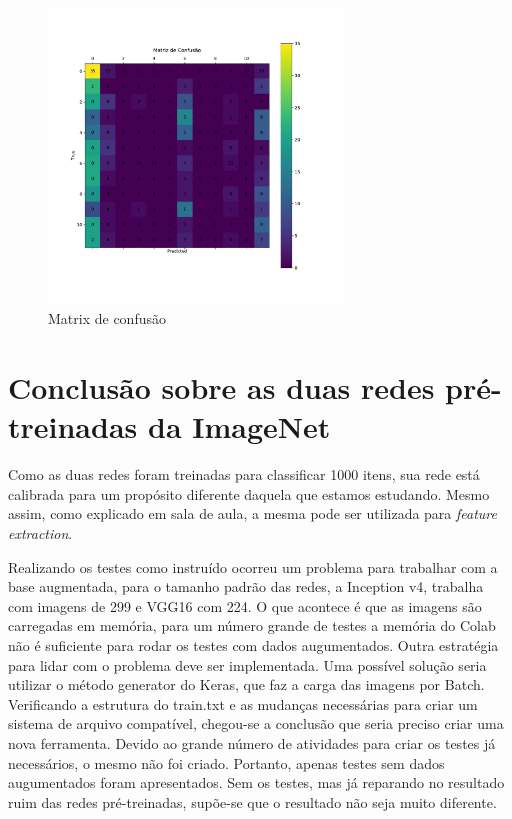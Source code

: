 \documentclass[12pt,
	english,			%
	french,				%
	spanish,			%
	brazil,				%
	]{article}
\begin{document}
\begin{figure}[!htb]
\centering
\includegraphics[width=0.7\textwidth]{images/cm_vgg16.pdf}
\caption{\label{fig:grafico01}Matrix de confusão}
\end{figure}

\section{Conclusão sobre as duas redes pré-treinadas da ImageNet}

Como as duas redes foram treinadas para classificar 1000 itens, sua rede está calibrada para um propósito diferente daquela que estamos estudando. Mesmo assim, como explicado em sala de aula, a mesma pode ser utilizada para \textit{feature extraction}.

Realizando os testes como instruído ocorreu um problema para trabalhar com a base augmentada, para o tamanho padrão das redes, a Inception v4, trabalha com imagens de 299 e VGG16 com 224. O que acontece é que as imagens são carregadas em memória, para um número grande de testes a memória do Colab não é suficiente para rodar os testes com dados augumentados. Outra estratégia para lidar com o problema deve ser implementada. Uma possível solução seria utilizar o método generator do Keras, que faz a carga das imagens por Batch. Verificando a estrutura do train.txt e as mudanças necessárias para criar um sistema de arquivo compatível, chegou-se a conclusão que seria preciso criar uma nova ferramenta. Devido ao grande número de atividades para criar os testes já necessários, o mesmo não foi criado. Portanto, apenas testes sem dados augumentados foram apresentados. Sem os testes, mas já reparando no resultado ruim das redes pré-treinadas, supõe-se que o resultado não seja muito diferente.
\end{document}
